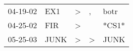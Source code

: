 \begin{supertabular}{lllll}
 04-19-02 &   EX1 &  \textgreater &             , &   botr \\
 04-25-02 &   FIR &  \textgreater &               &  *CS1* \\
 05-25-03 &  JUNK &  \textgreater &  \textgreater &   JUNK \\
\end{supertabular}
